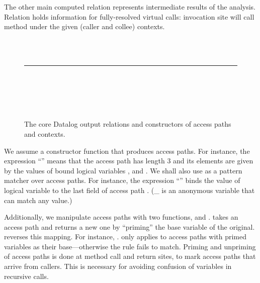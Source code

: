 The other main computed relation represents intermediate results of the analysis. Relation  holds information for fully-resolved virtual calls: invocation site  will call method  under the given (caller and collee) contexts.

\begin{figure}[hp]
\begin{datalog}
 \\
 \\
%
\noindent\rule{\textwidth}{0.5pt}\\
%
 \\
 \\
 \\
\end{datalog}
\caption[]{The core Datalog output relations and constructors of access paths and contexts.}
\label{fig:must-logic:output}
\end{figure}



We assume a constructor function  that produces access paths. For instance, the expression ``'' means that the access path  has length 3 and its elements are given by the values of bound logical variables ,  and . We shall also use  as a pattern matcher over access paths. For instance, the expression ``'' binds the value of logical variable  to the last field of access path . (\_ is an anonymous variable that can match any value.)

Additionally, we manipulate access paths with two functions,  and .  takes an access path and returns a new one by ``priming'' the base variable of the original.  reverses this mapping. For instance, .  only applies to access paths with primed variables as their base---otherwise the rule fails to match. Priming and unpriming of access paths is done at method call and return sites, to mark access paths that arrive from callers. This is necessary for avoiding confusion of variables in recursive calls.

